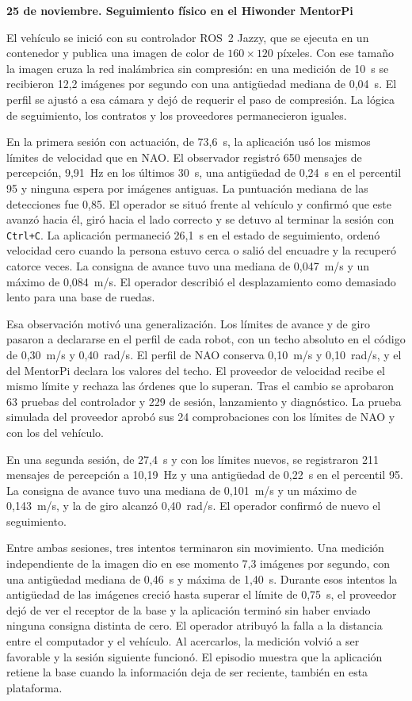 \documentclass[11pt,letterpaper]{article}
\newcommand{\code}[1]{\nolinkurl{#1}}
\begin{document}
\par\medskip\noindent\textbf{25 de noviembre. Seguimiento físico en el Hiwonder MentorPi}\par

El vehículo se inició con su controlador ROS~2 Jazzy, que se ejecuta en un contenedor y publica una imagen de color de $160\times120$ píxeles. Con ese tamaño la imagen cruza la red inalámbrica sin compresión: en una medición de 10~s se recibieron 12,2 imágenes por segundo con una antigüedad mediana de 0,04~s. El perfil se ajustó a esa cámara y dejó de requerir el paso de compresión. La lógica de seguimiento, los contratos y los proveedores permanecieron iguales.

En la primera sesión con actuación, de 73,6~s, la aplicación usó los mismos límites de velocidad que en NAO. El observador registró 650 mensajes de percepción, 9,91~Hz en los últimos 30~s, una antigüedad de 0,24~s en el percentil 95 y ninguna espera por imágenes antiguas. La puntuación mediana de las detecciones fue 0,85. El operador se situó frente al vehículo y confirmó que este avanzó hacia él, giró hacia el lado correcto y se detuvo al terminar la sesión con \code{Ctrl+C}. La aplicación permaneció 26,1~s en el estado de seguimiento, ordenó velocidad cero cuando la persona estuvo cerca o salió del encuadre y la recuperó catorce veces. La consigna de avance tuvo una mediana de 0,047~m/s y un máximo de 0,084~m/s. El operador describió el desplazamiento como demasiado lento para una base de ruedas.

Esa observación motivó una generalización. Los límites de avance y de giro pasaron a declararse en el perfil de cada robot, con un techo absoluto en el código de 0,30~m/s y 0,40~rad/s. El perfil de NAO conserva 0,10~m/s y 0,10~rad/s, y el del MentorPi declara los valores del techo. El proveedor de velocidad recibe el mismo límite y rechaza las órdenes que lo superan. Tras el cambio se aprobaron 63 pruebas del controlador y 229 de sesión, lanzamiento y diagnóstico. La prueba simulada del proveedor aprobó sus 24 comprobaciones con los límites de NAO y con los del vehículo.

En una segunda sesión, de 27,4~s y con los límites nuevos, se registraron 211 mensajes de percepción a 10,19~Hz y una antigüedad de 0,22~s en el percentil 95. La consigna de avance tuvo una mediana de 0,101~m/s y un máximo de 0,143~m/s, y la de giro alcanzó 0,40~rad/s. El operador confirmó de nuevo el seguimiento.

Entre ambas sesiones, tres intentos terminaron sin movimiento. Una medición independiente de la imagen dio en ese momento 7,3 imágenes por segundo, con una antigüedad mediana de 0,46~s y máxima de 1,40~s. Durante esos intentos la antigüedad de las imágenes creció hasta superar el límite de 0,75~s, el proveedor dejó de ver el receptor de la base y la aplicación terminó sin haber enviado ninguna consigna distinta de cero. El operador atribuyó la falla a la distancia entre el computador y el vehículo. Al acercarlos, la medición volvió a ser favorable y la sesión siguiente funcionó. El episodio muestra que la aplicación retiene la base cuando la información deja de ser reciente, también en esta plataforma.
\end{document}
